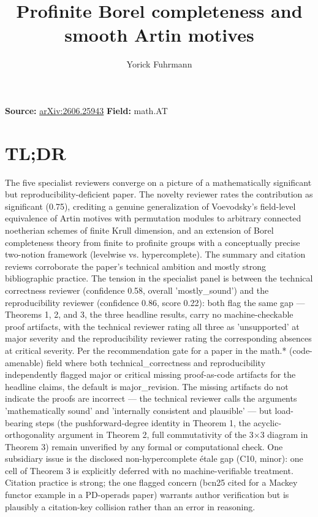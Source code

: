 \documentclass[11pt]{article}
\title{Profinite Borel completeness and smooth Artin motives}
\author{Yorick Fuhrmann}
\date{}
\begin{document}
\maketitle

\noindent\textbf{Source:} \href{https://arxiv.org/abs/2606.25943}{arXiv:2606.25943} \quad \textbf{Field:} math.AT\\

\section*{TL;DR}
The five specialist reviewers converge on a picture of a mathematically significant but reproducibility-deficient paper. The novelty reviewer rates the contribution as significant (0.75), crediting a genuine generalization of Voevodsky's field-level equivalence of Artin motives with permutation modules to arbitrary connected noetherian schemes of finite Krull dimension, and an extension of Borel completeness theory from finite to profinite groups with a conceptually precise two-notion framework (levelwise vs. hypercomplete). The summary and citation reviews corroborate the paper's technical ambition and mostly strong bibliographic practice. The tension in the specialist panel is between the technical correctness reviewer (confidence 0.58, overall 'mostly\_sound') and the reproducibility reviewer (confidence 0.86, score 0.22): both flag the same gap --- Theorems 1, 2, and 3, the three headline results, carry no machine-checkable proof artifacts, with the technical reviewer rating all three as 'unsupported' at major severity and the reproducibility reviewer rating the corresponding absences at critical severity. Per the recommendation gate for a paper in the math.* (code-amenable) field where both technical\_correctness and reproducibility independently flagged major or critical missing proof-as-code artifacts for the headline claims, the default is major\_revision. The missing artifacts do not indicate the proofs are incorrect --- the technical reviewer calls the arguments 'mathematically sound' and 'internally consistent and plausible' --- but load-bearing steps (the pushforward-degree identity in Theorem 1, the acyclic-orthogonality argument in Theorem 2, full commutativity of the 3\ensuremath{\times}3 diagram in Theorem 3) remain unverified by any formal or computational check. One subsidiary issue is the disclosed non-hypercomplete étale gap (C10, minor): one cell of Theorem 3 is explicitly deferred with no machine-verifiable treatment. Citation practice is strong; the one flagged concern (bcn25 cited for a Mackey functor example in a PD-operads paper) warrants author verification but is plausibly a citation-key collision rather than an error in reasoning.
\end{document}
